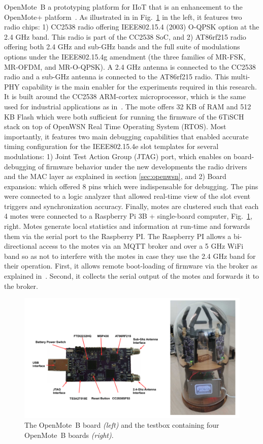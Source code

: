 \documentclass[sensors,article,submit,moreauthors,pdftex]{Definitions/mdpi}
\begin{document}
OpenMote~B a prototyping platform for IIoT that is an enhancement to the OpenMote+ platform~\cite{tuset16openmote}. 
As illustrated in in Fig.~\ref{fig:mote_ot} in the left,  it features two radio chips: 
	1) CC2538 radio offering IEEE802.15.4 (2003) O-QPSK option at the 2.4 GHz band. This radio is part of the CC2538 SoC, and 
    2) AT86rf215 radio offering both 2.4 GHz and sub-GHz bands and the full suite of modulations options under the IEEE802.15.4g amendment (the three families of MR-FSK, MR-OFDM, and MR-O-QPSK). 
A 2.4 GHz antenna is connected to the CC2538 radio and a sub-GHz antenna is connected to the AT86rf215 radio.
This multi-PHY capability is the main enabler for the experiments required in this research. 
It is built around the CC2538 ARM-cortex microprocessor, which is the same used for industrial applications as in~\cite{civerchia17industrial}.
The mote offers 32 KB of RAM and 512 KB Flash which were both sufficient for running the firmware of the 6TiSCH stack on top of OpenWSN Real Time Operating System (RTOS). 
Most importantly, it features two main debugging capabilities that enabled accurate timing configuration for the IEEE802.15.4e slot templates for several modulations:
1) Joint Test Action Group (JTAG) port, which enables on board-debugging of firmware behavior under the new developments the radio drivers and the MAC layer as explained in section \ref{sec:openwsn}, and 
2) Board expansion: which offered 8 pins which were indispensable for debugging. The pins were connected to a logic analyzer that allowed real-time view of the slot event triggers and synchronization accuracy.
Finally, motes are clustered such that each 4 motes were connected to a Raspberry Pi 3B + single-board computer, Fig.~\ref{fig:mote_ot}, right.
Motes generate local statistics and information at run-time and forwards them via the serial port to the Raspberry PI. 
The Raspberry PI allows a bi-directional access to the motes via an MQTT broker and over a 5 GHz WiFi band so as not to interfere with the motes in case they use the 2.4 GHz band for their operation.
First, it allows remote boot-loading of firmware via the broker as explained in~\cite{munoz19opentestbed}.
Second, it collects the serial output of the motes and forwards it to the  broker. 

\begin{figure}
	\centering
	\includegraphics[width=0.90\columnwidth]{mote_ot}
	\caption{
	    The OpenMote~B board \textit{(left)} and
	    the testbox containing four OpenMote~B boards \textit{(right)}.
	}
    \label{fig:mote_ot}
\end{figure}
\end{document}
